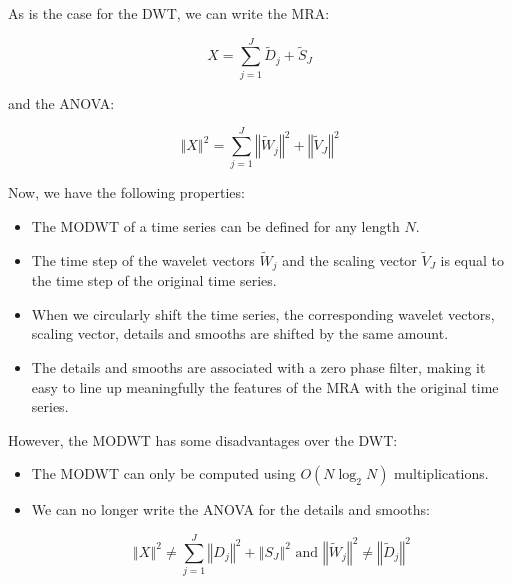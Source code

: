 \documentclass[draft]{agujournal2018}
\begin{document}
As is the case for the DWT, we can write the MRA:

\begin{equation}
X = \sum_{j = 1}^{J} \widetilde{D}_j + \widetilde{S}_J
\end{equation}

and the ANOVA:

\begin{equation}
\left\Vert X \right\Vert ^2 = \sum_{j = 1}^{J} \left\Vert \widetilde{W}_j \right\Vert ^2 + \left\Vert \widetilde{V}_J \right\Vert ^2
\end{equation}

Now, we have the following properties:

\begin{itemize}
	\item The MODWT of a time series can be defined for any length $N$.
	\item The time step of the wavelet vectors $\widetilde{W}_j$ and the scaling vector $\widetilde{V}_J$ is equal to the time step of the original time series.
	\item When we circularly shift the time series, the corresponding wavelet vectors, scaling vector, details and smooths are shifted by the same amount.
	\item The details and smooths are associated with a zero phase filter, making it easy to line up meaningfully the features of the MRA with the original time series.
\end{itemize}

However, the MODWT has some disadvantages over the DWT:

\begin{itemize}
	\item The MODWT can only be computed using $O \left( N \log_2 N \right)$ multiplications.
	\item We can no longer write the ANOVA for the details and smooths:

\begin{equation}
\left\Vert X \right\Vert ^2 \neq \sum_{j = 1}^{J} \left\Vert D_j \right\Vert ^2 + \left\Vert S_J \right\Vert ^2 \text{ and } \left\Vert \widetilde{W}_j \right\Vert ^2 \neq \left\Vert \widetilde{D}_j \right\Vert ^2
\end{equation}

\end{itemize}
\end{document}
